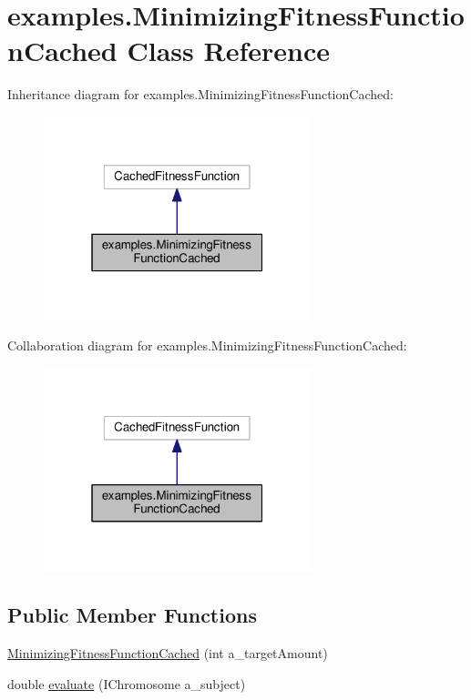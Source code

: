 \hypertarget{classexamples_1_1_minimizing_fitness_function_cached}{\section{examples.\-Minimizing\-Fitness\-Function\-Cached Class Reference}
\label{classexamples_1_1_minimizing_fitness_function_cached}
}


Inheritance diagram for examples.\-Minimizing\-Fitness\-Function\-Cached\-:
\nopagebreak
\begin{figure}[H]
\begin{center}
\leavevmode
\includegraphics[width=220pt]{classexamples_1_1_minimizing_fitness_function_cached__inherit__graph}
\end{center}
\end{figure}


Collaboration diagram for examples.\-Minimizing\-Fitness\-Function\-Cached\-:
\nopagebreak
\begin{figure}[H]
\begin{center}
\leavevmode
\includegraphics[width=220pt]{classexamples_1_1_minimizing_fitness_function_cached__coll__graph}
\end{center}
\end{figure}
\subsection*{Public Member Functions}
\begin{DoxyCompactItemize}
\item 
\hyperlink{classexamples_1_1_minimizing_fitness_function_cached_ae2310a65671136fb7fee893dec028605}{Minimizing\-Fitness\-Function\-Cached} (int a\-\_\-target\-Amount)
\item 
double \hyperlink{classexamples_1_1_minimizing_fitness_function_cached_a6a3490e28b1485ec6a4a8e55f9dfe80c}{evaluate} (I\-Chromosome a\-\_\-subject)
\end{DoxyCompactItemize}
